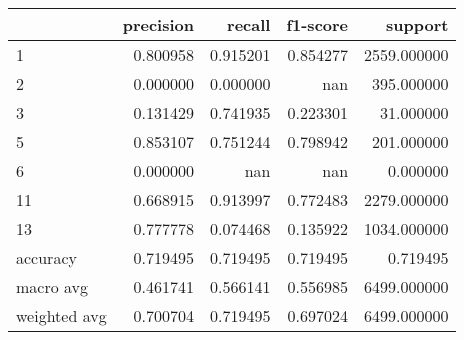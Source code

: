 \begin{tabular}{lrrrr}
\toprule
 & precision & recall & f1-score & support \\
\midrule
1 & 0.800958 & 0.915201 & 0.854277 & 2559.000000 \\
2 & 0.000000 & 0.000000 & nan & 395.000000 \\
3 & 0.131429 & 0.741935 & 0.223301 & 31.000000 \\
5 & 0.853107 & 0.751244 & 0.798942 & 201.000000 \\
6 & 0.000000 & nan & nan & 0.000000 \\
11 & 0.668915 & 0.913997 & 0.772483 & 2279.000000 \\
13 & 0.777778 & 0.074468 & 0.135922 & 1034.000000 \\
accuracy & 0.719495 & 0.719495 & 0.719495 & 0.719495 \\
macro avg & 0.461741 & 0.566141 & 0.556985 & 6499.000000 \\
weighted avg & 0.700704 & 0.719495 & 0.697024 & 6499.000000 \\
\bottomrule
\end{tabular}
